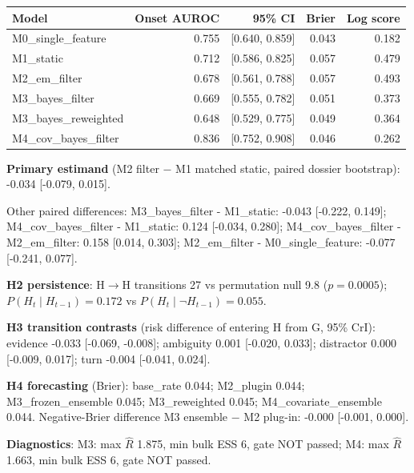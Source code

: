 \begin{center}\small\begin{tabular}{lrrrr}\toprule Model & Onset AUROC & 95\% CI & Brier & Log score\\\midrule

M0\_single\_feature & 0.755 & [0.640, 0.859] & 0.043 & 0.182\\

M1\_static & 0.712 & [0.586, 0.825] & 0.057 & 0.479\\

M2\_em\_filter & 0.678 & [0.561, 0.788] & 0.057 & 0.493\\

M3\_bayes\_filter & 0.669 & [0.555, 0.782] & 0.051 & 0.373\\

M3\_bayes\_reweighted & 0.648 & [0.529, 0.775] & 0.049 & 0.364\\

M4\_cov\_bayes\_filter & 0.836 & [0.752, 0.908] & 0.046 & 0.262\\

\bottomrule\end{tabular}\end{center}

\textbf{Primary estimand} (M2 filter $-$ M1 matched static, paired dossier bootstrap): -0.034 [-0.079, 0.015]. 

Other paired differences: M3\_bayes\_filter - M1\_static: -0.043 [-0.222, 0.149]; M4\_cov\_bayes\_filter - M1\_static: 0.124 [-0.034, 0.280]; M4\_cov\_bayes\_filter - M2\_em\_filter: 0.158 [0.014, 0.303]; M2\_em\_filter - M0\_single\_feature: -0.077 [-0.241, 0.077].

\textbf{H2 persistence}: H$\to$H transitions 27 vs permutation null 9.8 ($p=0.0005$); $P(H_t\mid H_{t-1})=0.172$ vs $P(H_t\mid \neg H_{t-1})=0.055$.

\textbf{H3 transition contrasts} (risk difference of entering H from G, 95\% CrI): evidence -0.033 [-0.069, -0.008]; ambiguity 0.001 [-0.020, 0.033]; distractor 0.000 [-0.009, 0.017]; turn -0.004 [-0.041, 0.024].

\textbf{H4 forecasting} (Brier): base\_rate 0.044; M2\_plugin 0.044; M3\_frozen\_ensemble 0.045; M3\_reweighted 0.045; M4\_covariate\_ensemble 0.044. Negative-Brier difference M3 ensemble $-$ M2 plug-in: -0.000 [-0.001, 0.000].

\textbf{Diagnostics}: M3: max $\widehat R$ 1.875, min bulk ESS 6, gate NOT passed; M4: max $\widehat R$ 1.663, min bulk ESS 6, gate NOT passed.

